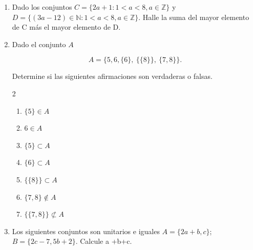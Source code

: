 \documentclass[12pt]{article}
\begin{document}
\begin{enumerate}
\begin{enumerate}
\item  $V = \left\{ \left(\dfrac{4x + 5}{3}\right) \in \mathbb{Z} :\; x \in \mathbb{Z},\ 3 < x < 7 \right\}
$
\item  $V = \left\{ \left(\dfrac{4x + 5}{3}\right) \in \mathbb{Z} :\; x \in \mathbb{R},\ 3 < x < 7 \right\}
$
\end{enumerate}
\item Dado los conjuntos $C=\{2a+1: 1<a<8, a\in \mathbb{Z}\}$ y $D=\{(3a-12)\in \mathbb{N}: 1<a<8, a\in \mathbb{Z}\}$. Halle la suma del mayor elemento de C más el
mayor elemento de D.


\item Dado el conjunto $A$

\[
A = \{5, 6, \{6\},\ \{\{8\}\},\ \{7,8\}\}.
\]

Determine si las siguientes afirmaciones son verdaderas o falsas.
\begin{multicols}{2}
    \begin{enumerate}
    \item $\{5\} \in A$
    \item $6 \in A$
    \item $\{5\} \subset A$
    \item $\{6\} \subset A$
    \item $\{\{8\}\} \subset A$
    \item $\{7,8\} \notin A$
    \item $\{\{7,8\}\} \not\subset A$
\end{enumerate}
\end{multicols}
\item Los siguientes conjuntos son unitarios e iguales
$A = \{2a+b, c\}$;
$B = \{2c -7, 5b+2\}$.
Calcule a +b+c.



\end{enumerate}
\end{document}
